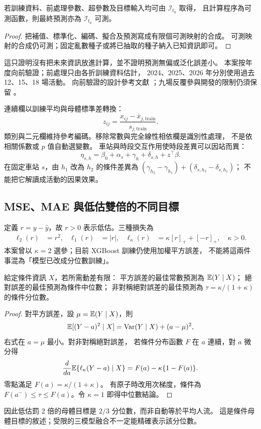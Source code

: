 \begin{proposition}[預測資訊的封閉性]
若訓練資料、前處理參數、超參數及目標輸入均可由 $\mathcal I_{t_0}$ 取得，
且計算程序為可測函數，則最終預測亦為 $\mathcal I_{t_0}$ 可測。
\end{proposition}
\begin{proof}
把補值、標準化、編碼、擬合及預測寫成有限個可測映射的合成。
可測映射的合成仍可測；固定亂數種子或將已抽取的種子納入已知資訊即可。
\end{proof}
這只證明沒有把未來資訊放進計算，並不證明預測無偏或泛化誤差小。
本案按年度向前驗證；前處理只由各折訓練資料估計，
2024、2025、2026 年分別使用過去 12、15、18 場活動。
向前驗證的設計參考文獻 \cite{fpp}；九場反覆參與開發的限制仍須保留
\cite{cawley}。

連續欄以訓練平均與母體標準差轉換：
\[
z_{ij}=\frac{x_{ij}-\bar x_{j,\mathrm{train}}}{s_{j,\mathrm{train}}}.
\]
類別與二元欄維持參考編碼。移除常數與完全線性相依欄是識別性處理，
不是依相關係數或 $p$ 值自動選變數。
車站與時段交互作用使時段差異可以因站而異：
\[
\eta_{s,h}=\beta_0+\alpha_s+\gamma_h+\delta_{s,h}+z^\top\beta.
\]
在固定車站 $s$，由 $h_1$ 改為 $h_2$ 的條件差異為
$(\gamma_{h_2}-\gamma_{h_1})+(\delta_{s,h_2}-\delta_{s,h_1})$；
不能把它解讀成活動的因果效果。

\subsection{MSE、MAE 與低估雙倍的不同目標}
定義 $r=y-\hat y$，故 $r>0$ 表示低估。三種損失為
\begin{align}
\ell_2(r)&=r^2,&
\ell_1(r)&=|r|,&
\ell_\kappa(r)&=\kappa[r]_++[-r]_+,\quad\kappa>0.
\label{eq:loss}
\end{align}
本案曾以 $\kappa=2$ 選參；目前 XGBoost 訓練仍使用加權平方誤差，
不能將這兩件事混為「模型已改成分位數訓練」。

\begin{proposition}[損失決定所估的母體位置]
給定條件資訊 $X$，若所需動差有限：
平方誤差的最佳常數預測為 $\mathbb E(Y\mid X)$；
絕對誤差的最佳預測為條件中位數；
非對稱絕對誤差的最佳預測為
$\tau=\kappa/(1+\kappa)$ 的條件分位數。
\end{proposition}
\begin{proof}
對平方誤差，設 $\mu=\mathbb E(Y\mid X)$，則
\[
\mathbb E[(Y-a)^2\mid X]=\operatorname{Var}(Y\mid X)+(a-\mu)^2,
\]
右式在 $a=\mu$ 最小。對非對稱絕對誤差，
若條件分布函數 $F$ 在 $a$ 連續，對 $a$ 微分得
\[
\frac{d}{da}\mathbb E\{\ell_\kappa(Y-a)\mid X\}
=F(a)-\kappa\{1-F(a)\}.
\]
零點滿足 $F(a)=\kappa/(1+\kappa)$。
有原子時改用次梯度，條件為
$F(a^-)\le\tau\le F(a)$。令 $\kappa=1$ 即得中位數結論。
\end{proof}
因此低估罰 2 倍的母體目標是 $2/3$ 分位數，而非自動等於平均人流。
這是條件母體目標的敘述；受限的三模型融合不一定能精確表示該分位數。

